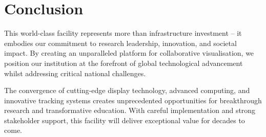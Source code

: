 \section{Conclusion}

This world-class facility represents more than infrastructure investment – it embodies our commitment to research leadership, innovation, and societal impact. By creating an unparalleled platform for collaborative visualisation, we position our institution at the forefront of global technological advancement whilst addressing critical national challenges.

The convergence of cutting-edge display technology, advanced computing, and innovative tracking systems creates unprecedented opportunities for breakthrough research and transformative education. With careful implementation and strong stakeholder support, this facility will deliver exceptional value for decades to come.